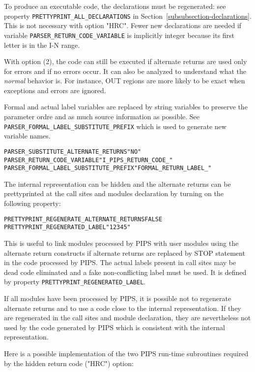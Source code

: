 \documentclass[a4paper]{report}
\newenvironment{PipsProp}{\begin{alltt}}{\end{alltt}}
\begin{document}
To produce an executable code, the declarations must be
regenerated: see property \verb/PRETTYPRINT_ALL_DECLARATIONS/ in
Section~\ref{subsubsection-declarations}. This is not necessary with
option "HRC". Fewer new declarations are needed if variable
\verb/PARSER_RETURN_CODE_VARIABLE/ is implicitly integer because its first
letter is in the I-N range.

With option (2), the code can still be executed if alternate returns are
used only for errors and if no errors occur. It can also be analyzed to
understand what the {\em normal} behavior is. For instance, OUT regions
are more likely to be exact when exceptions and errors are ignored.

Formal and actual label variables are replaced by string variables to
preserve the parameter ordre and as much source information as possible.
See \verb/PARSER_FORMAL_LABEL_SUBSTITUTE_PREFIX/ which is used to generate
new variable names.

\begin{PipsProp}
PARSER_SUBSTITUTE_ALTERNATE_RETURNS "NO"
PARSER_RETURN_CODE_VARIABLE "I_PIPS_RETURN_CODE_"
PARSER_FORMAL_LABEL_SUBSTITUTE_PREFIX "FORMAL_RETURN_LABEL_"
\end{PipsProp}

The internal representation can be hidden and the alternate returns can be
prettyprinted at the call sites and modules declaration by turning on the
following property:

\begin{PipsProp}
PRETTYPRINT_REGENERATE_ALTERNATE_RETURNS FALSE
PRETTYPRINT_REGENERATED_LABEL "12345"
\end{PipsProp}

This is useful to link modules processed by PIPS with user modules using
the alternate return constructs if alternate returns are replaced by STOP
statement in the code processed by PIPS. The actual labels present in call
sites may be dead code eliminated and a fake non-conflicting label must be
used. It is defined by property \verb/PRETTYPRINT_REGENERATED_LABEL/.

If all modules have been processed by PIPS, it is possible not to
regenerate alternate returns and to use a code close to the internal
representation. If they are regenerated in the call sites and module
declaration, they are nevertheless not used by the code generated by PIPS
which is consistent with the internal representation.

Here is a possible implementation of the two PIPS run-time subroutines
required by the hidden return code ("HRC") option:
\end{document}
